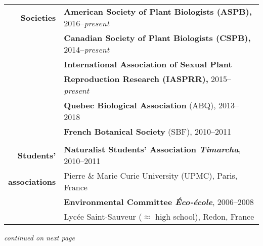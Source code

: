 \documentclass[letterpaper,10pt]{article}
\begin{document}
\begin{tabular}{r|p{14cm}}

\textbf{Societies}

 & \textbf{American Society of Plant Biologists (ASPB),} 2016--\emph{present}
   \vspace{2mm} \\

 & \textbf{Canadian Society of Plant Biologists (CSPB),} 2014--\emph{present}
   \vspace{2mm} \\

 & \textbf{International Association of Sexual Plant} \\
 & \textbf{Reproduction Research (IASPRR),} 2015--\emph{present}
   \vspace{2mm} \\

 & \textbf{Quebec Biological Association} (ABQ), 2013--2018
   \vspace{2mm} \\

 & \textbf{French Botanical Society} (SBF), 2010--2011 \\

\multicolumn{2}{c}{} \\

\textbf{Students'}
  & \textbf{Naturalist Students' Association \emph{Timarcha}}, 2010--2011 \\
\textbf{associations}
  & Pierre \& Marie Curie University (UPMC), Paris, France
    \vspace{2mm} \\

  & \textbf{Environmental Committee \emph{Éco-école}}, 2006--2008 \\
  & Lycée Saint-Sauveur ($\approx$ high school), Redon, France \\

\end{tabular}

\vspace{3mm}
\hfill \emph{\small continued on next page}
\end{document}
